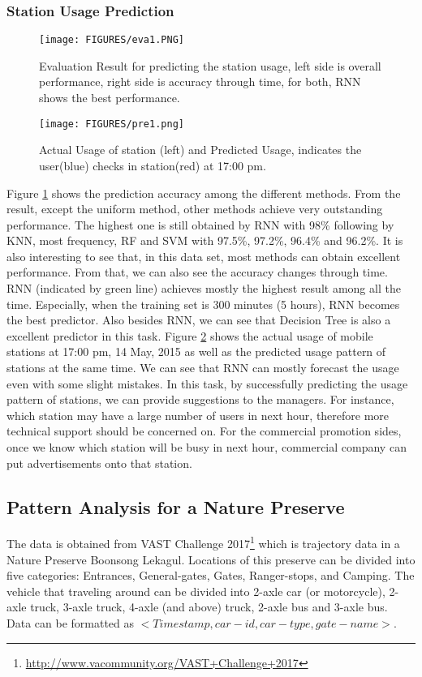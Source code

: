 \documentclass[runningheads,a4paper]{llncs}
\begin{document}
\subsubsection{Station Usage Prediction}
\begin{figure}[!h]
\centering
\texttt{[image: FIGURES/eva1.PNG]}
\caption{\label{fig:eva1} Evaluation Result for predicting the station usage, left side is overall performance, right side is accuracy through time, for both, RNN shows the best performance.}
\end{figure}
\begin{figure}[!h]
\centering
\texttt{[image: FIGURES/pre1.png]}
\caption{\label{fig:pre1} Actual Usage of station (left) and Predicted Usage, indicates the user(blue) checks in station(red) at 17:00 pm.}
\end{figure}
Figure \ref{fig:eva1} shows the prediction accuracy among the different methods. From the result, except the uniform method, other methods achieve very outstanding performance. The highest one is still obtained by RNN with 98\% following by KNN, most frequency, RF and SVM with 97.5\%, 97.2\%, 96.4\% and 96.2\%. It is also interesting to see that, in this data set, most methods can obtain excellent performance. From that, we can also see the accuracy changes through time. RNN (indicated by green line) achieves mostly the highest result among all the time. Especially, when the training set is 300 minutes (5 hours), RNN becomes the best predictor. Also besides RNN, we can see that Decision Tree is also a excellent predictor in this task.
Figure \ref{fig:pre1} shows the actual usage of mobile stations at 17:00 pm, 14 May, 2015 as well as the predicted usage pattern of stations at the same time. We can see that RNN can mostly forecast the usage even with some slight mistakes. In this task, by successfully predicting the usage pattern of stations, we can provide suggestions to the managers. For instance, which station may have a large number of users in next hour, therefore more technical support should be concerned on. For the commercial promotion sides, once we know which station will be busy in next hour, commercial company can put advertisements onto that station.

\subsection{Pattern Analysis for a Nature Preserve}
The data is obtained from VAST Challenge 2017\footnote{\url{http://www.vacommunity.org/VAST+Challenge+2017}} which is trajectory data in a Nature Preserve Boonsong Lekagul. Locations of this preserve can be divided into five categories: Entrances, General-gates, Gates, Ranger-stops, and Camping. The vehicle that traveling around can be divided into 2-axle car  (or motorcycle), 2-axle truck, 3-axle truck, 4-axle  (and above) truck, 2-axle bus and 3-axle bus. Data can be formatted as $<Timestamp,car-id,car-type,gate-name>$.
\end{document}
